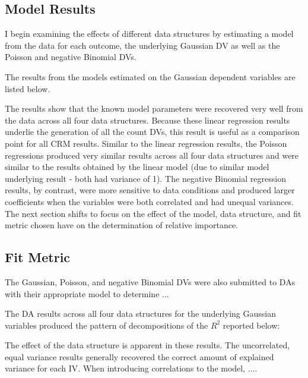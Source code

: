 \documentclass[ShortAfour,times,sageapa]{sagej}
\begin{document}
	\subsection{Model Results}
	
	
	I begin examining the effects of different data structures by estimating a model from the data for each outcome, the underlying Gaussian DV as well as the Poisson and negative Binomial DVs.
	
	The results from the models estimated on the Gaussian dependent variables are listed below.
	
	
	
	The results show that the known model parameters were recovered very well from the data across all four data structures.
	Because these linear regression results underlie the generation of all the count DVs, this result is useful as a comparison point for all CRM results.
	Similar to the linear regression results, the Poisson regressions produced very similar results across all four data structures and were similar to the results obtained by the linear model (due to similar model underlying result - both had variance of 1).
	The negative Binomial regression results, by contrast, were more sensitive to data conditions and produced larger coefficients when the variables were both correlated and had unequal variances.
	The next section shifts to focus on the effect of the model, data structure, and fit metric chosen have on the determination of relative importance.
	
	\subsection{Fit Metric}
	
	The Gaussian, Poisson, and negative Binomial DVs were also submitted to DAs with their appropriate model to determine ...
	
	
	The DA results across all four data structures for the underlying Gaussian variables produced the pattern of decompositions of the $R^2$ reported below:
	
	
	The effect of the data structure is apparent in these results.  
	The uncorrelated, equal variance results generally recovered the correct amount of explained variance for each IV.  
	When introducing correlations to the model, ....
	
\end{document}
